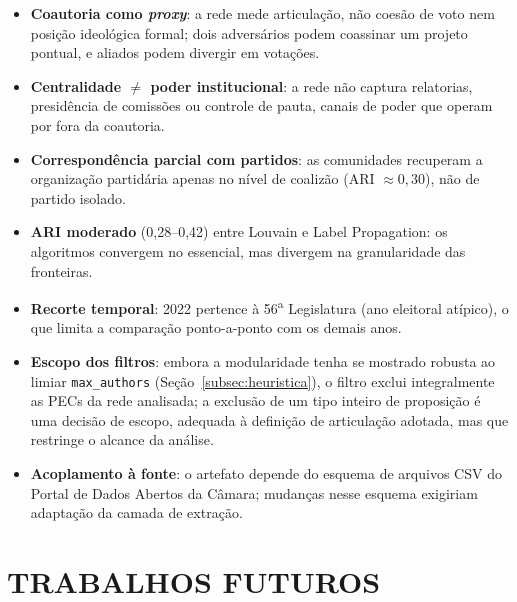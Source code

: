 \documentclass[
      12pt,
      a4paper,
      openright,
      oneside,
      chapter=TITLE,
      section=TITLE,
      english,
      french,
      spanish,
      brazilian
    ]{abntex2}
\begin{document}
    \begin{itemize}
        \item \textbf{Coautoria como \textit{proxy}}: a rede mede articulação, não coesão de voto nem posição ideológica formal; dois adversários podem coassinar um projeto pontual, e aliados podem divergir em votações.
        \item \textbf{Centralidade $\neq$ poder institucional}: a rede não captura relatorias, presidência de comissões ou controle de pauta, canais de poder que operam por fora da coautoria.
        \item \textbf{Correspondência parcial com partidos}: as comunidades recuperam a organização partidária apenas no nível de coalizão (ARI $\approx 0{,}30$), não de partido isolado.
        \item \textbf{ARI moderado} (0,28--0,42) entre Louvain e Label Propagation: os algoritmos convergem no essencial, mas divergem na granularidade das fronteiras.
        \item \textbf{Recorte temporal}: 2022 pertence à 56\textsuperscript{a} Legislatura (ano eleitoral atípico), o que limita a comparação ponto-a-ponto com os demais anos.
        \item \textbf{Escopo dos filtros}: embora a modularidade tenha se mostrado robusta ao limiar \texttt{max\_authors} (Seção~\ref{subsec:heuristica}), o filtro exclui integralmente as PECs da rede analisada; a exclusão de um tipo inteiro de proposição é uma decisão de escopo, adequada à definição de articulação adotada, mas que restringe o alcance da análise.
        \item \textbf{Acoplamento à fonte}: o artefato depende do esquema de arquivos CSV do Portal de Dados Abertos da Câmara; mudanças nesse esquema exigiriam adaptação da camada de extração.
    \end{itemize}
    
    \section{TRABALHOS FUTUROS}
    
\end{document}
